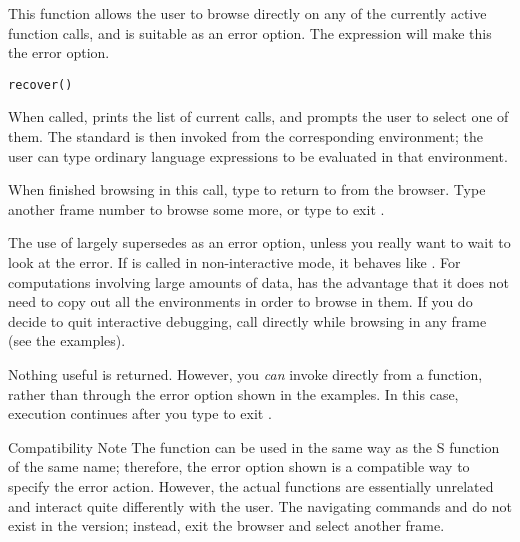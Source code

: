 %
\begin{Description}\relax
This function allows the user to browse directly on any of the
currently active function calls, and is suitable as an error option.
The expression  will make this
the error option.
\end{Description}
%
\begin{Usage}
\begin{verbatim}
recover()
\end{verbatim}
\end{Usage}
%
\begin{Details}\relax
When called,  prints the list of current calls, and
prompts the user to select one of them.  The standard \R{}
 is then invoked from the corresponding
environment; the user can type ordinary \R{} language expressions to be
evaluated in that environment.

When finished browsing in this call, type  to return to
 from the browser.  Type another frame number to browse
some more, or type  to exit .

The use of  largely supersedes 
as an error option, unless you really want to wait to look at the
error.  If  is called in non-interactive mode, it
behaves like .  For computations involving large
amounts of data,  has the advantage that it does not
need to copy out all the environments in order to browse in them.  If
you do decide to quit interactive debugging, call
 directly while browsing in any frame (see
the examples).
\end{Details}
%
\begin{Value}
Nothing useful is returned.  However, you \emph{can} invoke
 directly from a function, rather than through the error
option shown in the examples.  In this case, execution continues
after you type  to exit .
\end{Value}
%
\begin{Section}{Compatibility Note}
The \R{}  function can be used in the same way as the
S function of the same name; therefore, the error option shown is
a compatible way to specify the error action.  However, the actual
functions are essentially unrelated and interact quite differently
with the user.  The navigating commands  and  do
not exist in the \R{} version; instead, exit the browser and select
another frame.
\end{Section}
